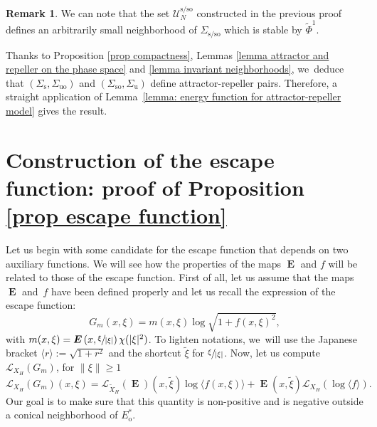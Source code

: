\documentclass[JEP,XML,SOM,Unicode,NoEqCountersInSection,NoFloatCountersInSection,published]{cedram}
\newcommand{\ro}{\mathrm{o}}
\newcommand{\rs}{\mathrm{s}}
\newcommand{\rso}{\mathrm{so}}
\newcommand{\ru}{\mathrm{u}}
\newcommand{\ruo}{\mathrm{uo}}
\theoremstyle{definition}
\newtheorem{remark}[definition]{Remark}
\theoremstyle{plain}
\newcommand{\Lie}{\mathcal{L}}
\newcommand{\Ucal}{\mathcal{U}}
\newcommand{\w}[1]{\langle {#1} \rangle}
\DeclareMathOperator{\E}{\boldsymbol{E}}
\begin{document}
\begin{remark}
We can note that the set $\Ucal_N^{\rs/\rso}$ constructed in the previous proof defines an arbitrarily small neighborhood of $\Sigma_{\rs/\rso}$ which is stable by $\widetilde{\Phi}^1$.
\end{remark}

\label{subsection: Proof energy functions for the Hamiltonian flow}

Thanks to Proposition \ref{prop compactness}, Lemmas \ref{lemma attractor and repeller on the phase space} and \ref{lemma invariant neighborhoods}, we~deduce that $(\Sigma_{\rs},\Sigma_{\ruo})$ and $(\Sigma_{\rso},\Sigma_{\ru})$ define attractor-repeller pairs. Therefore, a straight application of Lemma~\ref{lemma: energy function for attractor-repeller model} gives the result.

\section{Construction of the escape function: proof of Proposition \ref{prop escape function}}\label{section: Proof of escape function}

Let us begin with some candidate for the escape function that depends on two auxiliary functions. We will see how the properties of the maps $\E$ and $f$ will be related to those of the escape function. First of all, let us assume that the maps~$\E$ and~$f$ have been defined properly and let us recall the expression of the escape function:
\[
G_m (x,\xi) = m(x,\xi) \log \sqrt{1 + f(x,\xi)^2},
\]
with $m(x, \xi) = \E \left(x, \sfrac{\xi}{|\xi|} \right) \chi (|\xi|^2)$. To lighten notations, we~will use the Japanese bracket $\w{r}:= \sqrt{1 + r^2}$ and the shortcut $\tilde{\xi}$ for $\sfrac{\xi}{|\xi|}$. Now, let us compute $\Lie_{X_H} (G_m)$, for $\|\xi\|\geq 1$
\[
\Lie_{X_H} \left(G_m \right) (x,\xi) = \Lie_{\widetilde{X}_H} (\E) (x, \tilde{\xi}) \log \w{f(x,\xi)} + \E (x, \tilde{\xi}) \Lie_{X_H}(\log \w{f}).
\]
Our goal is to make sure that this quantity is non-positive and is negative outside a conical neighborhood of $E_\ro^*$.
\end{document}
